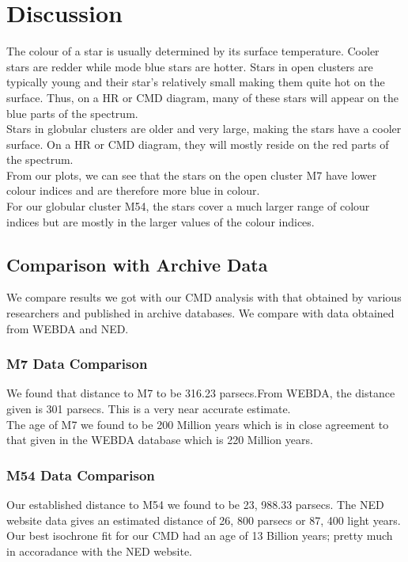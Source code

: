 \documentclass[12pt]{article}
\begin{document}
	\section{Discussion}
	The colour of a star is usually determined by its surface temperature. Cooler stars are redder while mode blue stars are hotter. Stars in open clusters are typically young and their star's relatively small making them quite hot on the surface. Thus, on a HR or CMD diagram, many of these stars will appear on the blue parts of the spectrum.\\
	Stars in globular clusters are older and very large, making the stars have a cooler surface. On a HR or CMD diagram, they will mostly reside on the red parts of the spectrum.\\
	From our plots, we can see that the stars on the open cluster M7 have lower colour indices and are therefore more blue in colour.\\
	For our globular cluster M54, the stars cover a much larger range of colour indices but are mostly in the larger values of the colour indices.\\
		\subsection{Comparison with Archive Data}
		We compare results we got with our CMD analysis with that obtained by various researchers and published in archive databases. We compare with data obtained from WEBDA and NED.
		\subsubsection{M7 Data Comparison}
		We found that distance to M7 to be 316.23 parsecs.From WEBDA, the distance given is 301 parsecs. This is a very near accurate estimate.\\
		The age of M7 we found to be 200 Million years which is in close agreement to that given in the WEBDA database which is 220 Million years.
		\subsubsection{M54 Data Comparison}
		Our established distance to M54 we found to be 23, 988.33 parsecs. The NED website data gives an estimated distance of 26, 800 parsecs or 87, 400 light years.\\
		Our best isochrone fit for our CMD had an age of 13 Billion years; pretty much in accoradance with the NED website.
\end{document}
